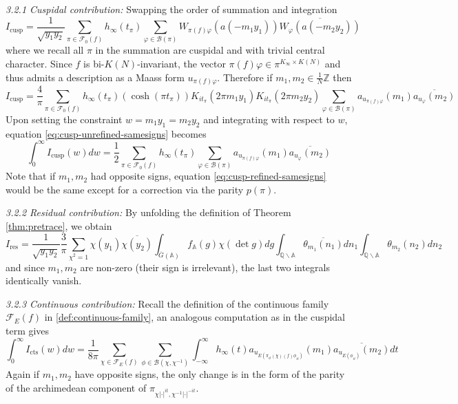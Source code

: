 \documentclass{article}
\numberwithin{equation}{section}
\begin{document}
\noindent \emph{3.2.1 Cuspidal contribution:} Swapping the order of summation and integration 
$$I_\text{cusp}=\frac{1}{\sqrt{y_1y_2}}\sum_{\pi \in \mathcal{F}_0(f)}h_\infty(t_\pi)\sum_{\varphi \in \mathcal{B}(\pi)}W_{\pi(f)\varphi}(a(-m_1y_1))\overline{W_\varphi(a(-m_2y_2))}$$
where we recall all $\pi$ in the summation are cuspidal and with trivial central character. Since $f$ is bi-$K(N)$-invariant, the vector $\pi(f)\varphi \in \pi^{K_\infty \times K(N)}$ and thus admits a description as a Maass form $u_{\pi(f)\varphi}$.
Therefore if $m_1,m_2 \in \tfrac{1}{N}\mathbb{Z}$ then
\begin{equation}\label{eq:cusp-unrefined-samesigns}
        I_\text{cusp}=\frac{4}{\pi}\sum_{\pi \in \mathcal{F}_0(f)}h_\infty(t_\pi)(\cosh (\pi t_\pi))K_{it_\pi}(2\pi m_1y_1)K_{it_\pi}(2\pi m_2 y_2) \sum_{\varphi \in \mathcal{B}(\pi)}a_{u_{\pi(f)\varphi}}(m_1)\overline{a_{u_\varphi}(m_2)}  
\end{equation}
Upon setting the constraint $w=m_1y_1 = m_2y_2$ and integrating with respect to $w$, equation \eqref{eq:cusp-unrefined-samesigns} becomes
\begin{equation}\label{eq:cusp-refined-samesigns}
    \int_0^\infty I_\text{cusp}(w)dw = \frac{1}{2}\sum_{\pi \in \mathcal{F}_0(f)}h_\infty(t_\pi)\sum_{\varphi \in \mathcal{B}(\pi)}a_{u_{\pi(f)\varphi}}(m_1) \overline{a_{u_\varphi}(m_2)}
\end{equation}
Note that if $m_1,m_2$ had opposite signs, equation \eqref{eq:cusp-refined-samesigns} would be the same except for a correction via the parity $p(\pi)$. \bigbreak 

\noindent \emph{3.2.2 Residual contribution:} By unfolding the definition of Theorem \ref{thm:pretrace}, we obtain
$$I_\text{res}=\frac{1}{\sqrt{y_1y_2}}\frac{3}{\pi}\sum_{\chi^2=1}\chi(y_1)\overline{\chi(y_2)}\int_{\overline{G}(\mathbb{A})}f_{\mathbb{A}}(g)\chi(\det g)dg \int_{\mathbb{Q}\backslash \mathbb{A}}\overline{\theta_{m_1}(n_1)}dn_1 \int_{\mathbb{Q}\backslash \mathbb{A}}\theta_{m_2}(n_2)dn_2$$
and since $m_1, m_2$ are non-zero (their sign is irrelevant), the last two integrals identically vanish. \bigbreak 

\noindent \emph{3.2.3 Continuous contribution:} Recall the definition of the continuous family $\mathcal{F}_E(f)$ in \eqref{def:continuous-family},
an analogous computation as in the cuspidal term gives
\begin{equation}
    \int_{0}^{\infty}I_\text{cts}(w)dw=\frac{1}{8\pi}\sum_{\chi \in \mathcal{F}_E(f)}\sum_{\phi \in \mathcal{B}(\chi,\chi^{-1})}\int_{-\infty}^{\infty}h_\infty(t)a_{u_{E(\pi_{it}(\chi)(f)\phi_{it})}}
(m_1)\overline{a_{u_{E(\phi_{it})}}(m_2)}dt\end{equation}
Again if $m_1,m_2$ have opposite signs, the only change is in the form of the parity of the archimedean component of $\pi_{\chi|\cdot|^{it},\chi^{-1}|\cdot|^{-it}}$.
\bigbreak 
\end{document}
